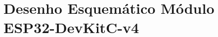 \chapter[Esquema DevKit]{Desenho Esquemático Módulo ESP32-DevKitC-v4}

\label{ane:kit}

\begin{landscape}

\end{landscape}